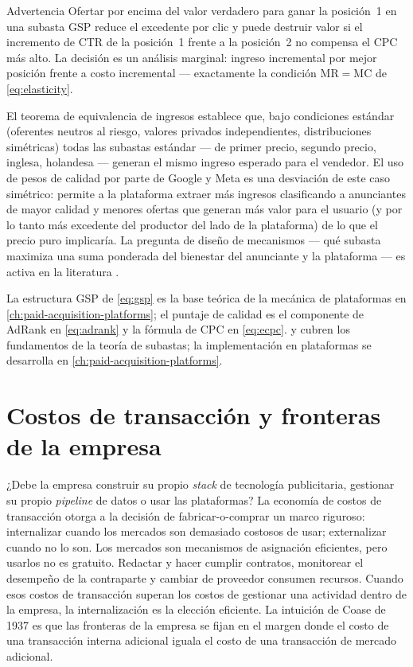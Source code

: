 \begin{admonition}{Advertencia}
Ofertar por encima del valor verdadero para ganar la posición~1 en una subasta GSP reduce el
excedente por clic y puede destruir valor si el incremento de CTR de la posición~1 frente a la
posición~2 no compensa el CPC más alto. La decisión es un análisis marginal: ingreso incremental
por mejor posición frente a costo incremental --- exactamente la condición \(\mathrm{MR}=\mathrm{MC}\)
de \cref{eq:elasticity}.
\end{admonition}

El teorema de equivalencia de ingresos establece que, bajo condiciones estándar (oferentes neutros
al riesgo, valores privados independientes, distribuciones simétricas) todas las subastas estándar
--- de primer precio, segundo precio, inglesa, holandesa --- generan el mismo ingreso esperado para
el vendedor. El uso de pesos de calidad por parte de Google y Meta es una desviación de este caso
simétrico: permite a la plataforma extraer más ingresos clasificando a anunciantes de mayor calidad
y menores ofertas que generan más valor para el usuario (y por lo tanto más excedente del productor
del lado de la plataforma) de lo que el precio puro implicaría. La pregunta de diseño de mecanismos
--- qué subasta maximiza una suma ponderada del bienestar del anunciante y la plataforma --- es activa
en la literatura \parencite{mankiw2020}.

La estructura GSP de \cref{eq:gsp} es la base teórica de la mecánica de plataformas en
\cref{ch:paid-acquisition-platforms}; el puntaje de calidad es el componente de AdRank en
\cref{eq:adrank} y la fórmula de CPC en \cref{eq:ecpc}. \textcite{mankiw2020} y
\textcite{dranove7theconomics} cubren los fundamentos de la teoría de subastas; la implementación
en plataformas se desarrolla en \cref{ch:paid-acquisition-platforms}.

\section{Costos de transacción y fronteras de la empresa}\label{sec:transaction-costs}

¿Debe la empresa construir su propio \emph{stack} de tecnología publicitaria, gestionar su propio
\emph{pipeline} de datos o usar las plataformas? La economía de costos de transacción otorga a la
decisión de fabricar-o-comprar un marco riguroso: internalizar cuando los mercados son demasiado
costosos de usar; externalizar cuando no lo son. Los mercados son mecanismos de asignación
eficientes, pero usarlos no es gratuito. Redactar y hacer cumplir contratos, monitorear el
desempeño de la contraparte y cambiar de proveedor consumen recursos. Cuando esos costos de
transacción superan los costos de gestionar una actividad dentro de la empresa, la internalización
es la elección eficiente. La intuición de Coase de 1937 es que las fronteras de la empresa se
fijan en el margen donde el costo de una transacción interna adicional iguala el costo de una
transacción de mercado adicional.

